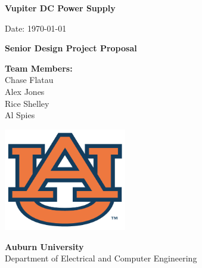 \documentclass{article}
\begin{document}
\begin{titlepage}
    \begin{center}
        \vspace*{1cm}
            
        \Huge
        \textbf{Vupiter DC Power Supply}
            
        \vspace{0.5cm}
        \LARGE
        Date: \today
            
        \vspace{4.5cm}

        \textbf{Senior Design Project Proposal}
        
        \vspace{1cm}

        \textbf{Team Members:}\\
        Chase Flatau\\
        Alex Jones\\
        Rice Shelley\\
        Al Spies
        \vfill
            
            
        \vspace{0.8cm}
            
        \includegraphics[width=0.4\textwidth]{university}
            
        \Large

        \textbf{Auburn University}\\
        Department of Electrical and Computer Engineering\\

            
    \end{center}
\end{titlepage}

\tableofcontents
\pagebreak
\end{document}

